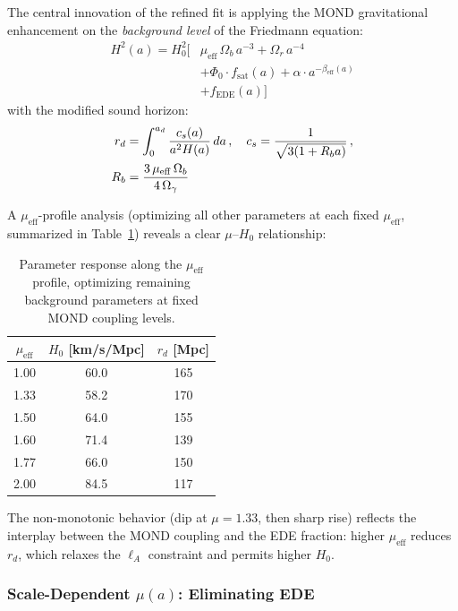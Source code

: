 \documentclass[aps,prd,twocolumn,superscriptaddress,nofootinbib,floatfix]{revtex4-2}
\begin{document}
The central innovation of the refined fit is applying the MOND gravitational enhancement on the \textit{background level} of the Friedmann equation:
\begin{equation}
\begin{split}
H^2(a) = H_0^2 \Big[&\mu_{\mathrm{eff}}\,\Omega_b\,a^{-3} + \Omega_r\,a^{-4} \\
&+ \Phi_0 \cdot f_{\mathrm{sat}}(a) + \alpha \cdot a^{-\beta_{\mathrm{eff}}(a)} \\
&+ f_{\mathrm{EDE}}(a)\Big]
\end{split}
\label{eq:mond_friedmann}
\end{equation}
with the modified sound horizon:
\begin{align}
r_d &= \int_0^{a_d} \frac{c_s(a)}{a^2 H(a)} \, da\,,\quad c_s = \frac{1}{\sqrt{3(1 + R_b a)}}\,,\notag\\
R_b &= \frac{3\,\mu_{\mathrm{eff}}\,\Omega_b}{4\,\Omega_\gamma}
\label{eq:mond_rs}
\end{align}

A $\mu_{\mathrm{eff}}$-profile analysis (optimizing all other parameters at each fixed $\mu_{\mathrm{eff}}$, summarized in Table~\ref{tab:mu_profile}) reveals a clear $\mu$--$H_0$ relationship:

\begin{table}[t]
\centering
\caption{Parameter response along the $\mu_{\mathrm{eff}}$ profile, optimizing remaining background parameters at fixed MOND coupling levels.}
\label{tab:mu_profile}
\begin{tabular}{ccc}
\toprule
$\mu_{\mathrm{eff}}$ & $H_0$ [km/s/Mpc] & $r_d$ [Mpc] \\
\midrule
1.00 & 60.0 & 165 \\
1.33 & 58.2 & 170 \\
1.50 & 64.0 & 155 \\
1.60 & 71.4 & 139 \\
1.77 & 66.0 & 150 \\
2.00 & 84.5 & 117 \\
\bottomrule
\end{tabular}
\end{table}


The non-monotonic behavior (dip at $\mu = 1.33$, then sharp rise) reflects the interplay between the MOND coupling and the EDE fraction: higher $\mu_{\mathrm{eff}}$ reduces $r_d$, which relaxes the $\ell_A$ constraint and permits higher $H_0$.

\subsubsection{Scale-Dependent \texorpdfstring{$\mu(a)$}{mu(a)}: Eliminating EDE}
\label{subsubsec:mu_scale}
\end{document}
